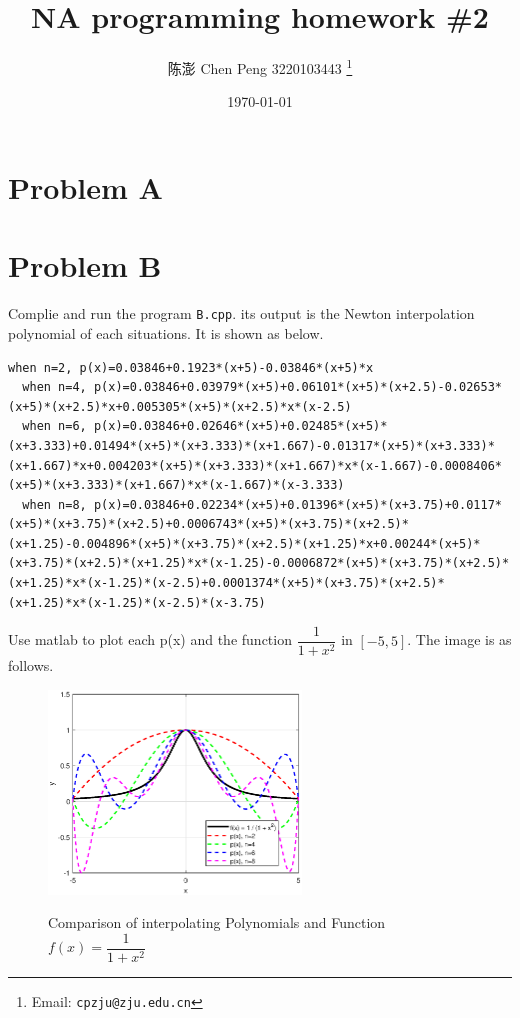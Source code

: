 \documentclass[a4paper]{article}
\begin{document}
\title{NA programming homework \#2}

\author{陈澎 Chen Peng 3220103443
  \thanks{Email: \texttt{cpzju@zju.edu.cn}}}


\date{\today}

\maketitle

\section*{Problem A}


\section*{Problem B}
Complie and run the program \verb|B.cpp|. its output is the Newton interpolation polynomial of each situations.
It is shown as below.
\begin{lstlisting}[breaklines=true]
  when n=2, p(x)=0.03846+0.1923*(x+5)-0.03846*(x+5)*x
  when n=4, p(x)=0.03846+0.03979*(x+5)+0.06101*(x+5)*(x+2.5)-0.02653*(x+5)*(x+2.5)*x+0.005305*(x+5)*(x+2.5)*x*(x-2.5)
  when n=6, p(x)=0.03846+0.02646*(x+5)+0.02485*(x+5)*(x+3.333)+0.01494*(x+5)*(x+3.333)*(x+1.667)-0.01317*(x+5)*(x+3.333)*(x+1.667)*x+0.004203*(x+5)*(x+3.333)*(x+1.667)*x*(x-1.667)-0.0008406*(x+5)*(x+3.333)*(x+1.667)*x*(x-1.667)*(x-3.333)
  when n=8, p(x)=0.03846+0.02234*(x+5)+0.01396*(x+5)*(x+3.75)+0.0117*(x+5)*(x+3.75)*(x+2.5)+0.0006743*(x+5)*(x+3.75)*(x+2.5)*(x+1.25)-0.004896*(x+5)*(x+3.75)*(x+2.5)*(x+1.25)*x+0.00244*(x+5)*(x+3.75)*(x+2.5)*(x+1.25)*x*(x-1.25)-0.0006872*(x+5)*(x+3.75)*(x+2.5)*(x+1.25)*x*(x-1.25)*(x-2.5)+0.0001374*(x+5)*(x+3.75)*(x+2.5)*(x+1.25)*x*(x-1.25)*(x-2.5)*(x-3.75)
\end{lstlisting}

Use matlab to plot each p(x) and the function $\dfrac{1}{1+x^2}$ in $[-5,5]$. The image is as follows.
\begin{figure}[htbp]
  \centering
  {\includegraphics[width=0.6\textwidth]{images/B_pic.eps}\label{fig1}}  
  \renewcommand{\figurename}{Fig.}
  \caption{Comparison of interpolating Polynomials and Function $f(x)=\dfrac{1}{1+x^2}$}
\end{figure}
\end{document}
